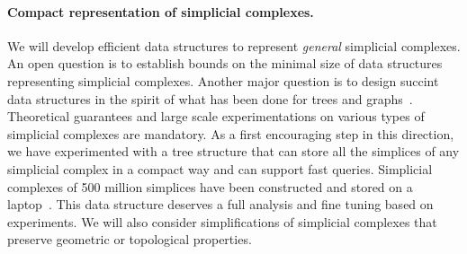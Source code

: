 \paragraph{Compact representation of simplicial complexes.}  We will develop efficient data structures to represent {\em general} simplicial complexes. 
An open question is to establish bounds on the minimal size of data structures representing simplicial complexes. Another major question is to design succint data structures
in the spirit of what has been done for trees and graphs~\cite{Ferragina:2005:SLT:1097112.1097456,Munro:2002:SRB:586840.586885}. 
 Theoretical guarantees and large scale experimentations on various
 types of simplicial complexes are mandatory. As a first encouraging
 step in this direction, we have experimented with a tree structure
 that can store all the simplices of any simplicial complex in a
 compact way and can support fast queries. Simplicial complexes of 500 million simplices have been constructed and stored on a laptop~\cite{bm-dssc-2012}. 
This data structure deserves a full analysis and fine tuning based on experiments.
We will also consider simplifications of simplicial complexes that preserve geometric or topological properties.










